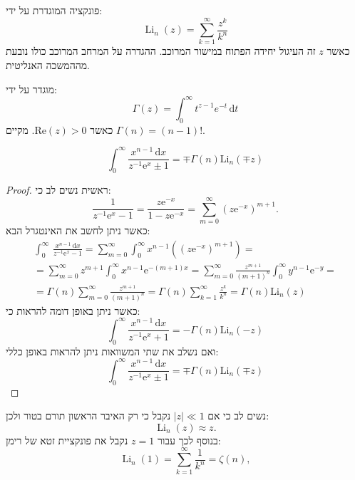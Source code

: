 \documentclass{tstextbook}
\begin{document}
\begin{definition}[פולילוגוריתם]
פונקציה המוגדרת על ידי:
$$\operatorname{Li}_{n}(z)=\sum_{k=1}^{\infty}{\frac{z^{k}}{k^{n}}}$$
כאשר \(z\) זה העיגול יחידה הפתוח במישור המרוכב. ההגדרה על המרחב המרוכב כולו נובעת מההמשכה האנליטית.

\end{definition}
\begin{reminder}
מוגדר על ידי:
$$\Gamma(z)=\int_{0}^{\infty} t^{z-1}e^{ -t } \, \mathrm{d}t $$
כאשר \(\mathrm{Re}(z)>0\). מקיים \(\Gamma(n)=(n-1)!\).

\end{reminder}
\begin{proposition}
$$\int_{0}^{\infty}\frac{x^{n-1}\,\mathrm{d}x}{z^{-1}\mathrm{e}^{x}\pm1}=\mp\Gamma(n)\mathrm{Li}_{n}(\mp z)$$

\end{proposition}
\begin{proof}
ראשית נשים לב כי:
$${\frac{1}{z^{-1}\mathrm{e}^{x}-1}}={\frac{z\mathrm{e}^{-x}}{1-z\mathrm{e}^{-x}}}=\sum_{m=0}^{\infty}(z\mathrm{e}^{-x})^{m+1}.$$
כאשר ניתן לחשב את האינטגרל הבא:
$$\begin{gather}\int_{0}^{\infty}\,\frac{x^{n-1}\,\mathrm{d}x}{z^{-1}\mathrm{e}^{x}-1}=\sum_{m=0}^{\infty}\int_{0}^{\infty}x^{n-1}\left( \left( z\mathrm{e}^{-x} \right)^{m+1} \right)=\\=\sum_{m=0}^{\infty}z^{m+1}\int_{0}^{\infty}x^{n-1}\mathrm{e}^{-(m+1)x}=\sum_{m=0}^{\infty}{\frac{z^{m+1}}{(m+1)^{n}}}\int_{0}^{\infty}y^{n-1}\mathrm{e}^{-y}=\\=\Gamma(n)\sum_{m=0}^{\infty}\frac{z^{m+1}}{(m+1)^{n}}=\Gamma(n)\sum_{k=1}^{\infty}\frac{z^{k}}{k^{n}} =\Gamma(n)\mathrm{Li}_{n}(z) 
\end{gather}$$
כאשר ניתן באופן דומה להראות כי:
$$\int_{0}^{\infty}\frac{x^{n-1}\,\mathrm{d}x}{z^{-1}\mathrm{e}^{x}+1}=-\Gamma(n)\mathrm{Li}_{n}(-z)$$
ואם נשלב את שתי המשוואות ניתן להראות באופן כללי:
$$\int_{0}^{\infty}\frac{x^{n-1}\,\mathrm{d}x}{z^{-1}\mathrm{e}^{x}\pm1}=\mp\Gamma(n)\mathrm{Li}_{n}(\mp z)$$

\end{proof}
\begin{remark}
נשים לב כי אם \(|z|\ll 1\) נקבל כי רק האיבר הראשון תורם בטור ולכן:
$$\operatorname{Li}_{n}(z)\approx z.$$
בנוסף לכך עבור \(z=1\) נקבל את פונקציית זטא של רימן:
$$\operatorname{Li}_{n}(1)=\sum_{k=1}^{\infty}{\frac{1}{k^{n}}}=\zeta(n),$$

\end{remark}
\end{document}
